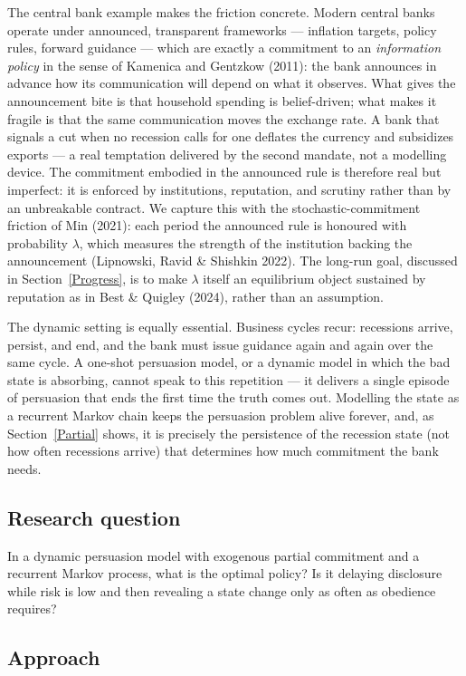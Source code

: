 \documentclass[12pt]{article}
\begin{document}
The central bank example makes the friction concrete. Modern central banks operate under announced, transparent frameworks --- inflation targets, policy rules, forward guidance --- which are exactly a commitment to an \emph{information policy} in the sense of Kamenica and Gentzkow (2011): the bank announces in advance how its communication will depend on what it observes. What gives the announcement bite is that household spending is belief-driven; what makes it fragile is that the same communication moves the exchange rate. A bank that signals a cut when no recession calls for one deflates the currency and subsidizes exports --- a real temptation delivered by the second mandate, not a modelling device. The commitment embodied in the announced rule is therefore real but imperfect: it is enforced by institutions, reputation, and scrutiny rather than by an unbreakable contract. We capture this with the stochastic-commitment friction of Min (2021): each period the announced rule is honoured with probability $\lambda$, which measures the strength of the institution backing the announcement (Lipnowski, Ravid \& Shishkin 2022). The long-run goal, discussed in Section~\ref{Progress}, is to make $\lambda$ itself an equilibrium object sustained by reputation as in Best \& Quigley (2024), rather than an assumption.

The dynamic setting is equally essential. Business cycles recur: recessions arrive, persist, and end, and the bank must issue guidance again and again over the same cycle. A one-shot persuasion model, or a dynamic model in which the bad state is absorbing, cannot speak to this repetition --- it delivers a single episode of persuasion that ends the first time the truth comes out. Modelling the state as a recurrent Markov chain keeps the persuasion problem alive forever, and, as Section~\ref{Partial} shows, it is precisely the persistence of the recession state (not how often recessions arrive) that determines how much commitment the bank needs.

\subsection{Research question}\label{Research question}

In a dynamic persuasion model with exogenous partial commitment and a recurrent Markov process, what is the optimal policy? Is it delaying disclosure while risk is low and then revealing a state change only as often as obedience requires?

\subsection{Approach}\label{Approach}
\end{document}

